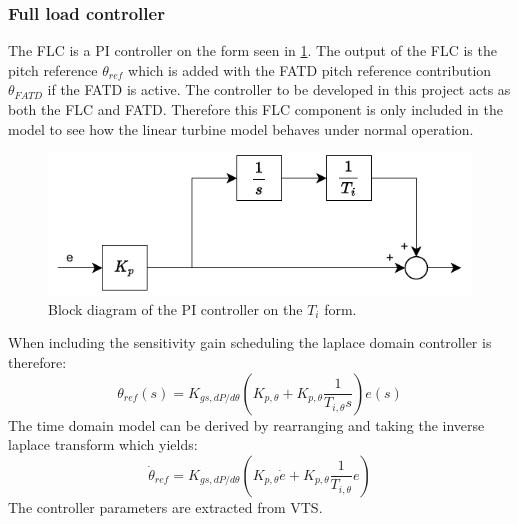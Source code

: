 \subsubsection{Full load controller} \label{sec:comp_flc}
The FLC is a PI controller on the form seen in \cref{fig:PIcontroller}. The output of the FLC is the pitch reference $ \theta_{ref} $ which is added with the FATD pitch reference contribution $ \theta_{FATD} $ if the FATD is active. The controller to be developed in this project acts as both the FLC and FATD. Therefore this FLC component is only included in the model to see how the linear turbine model behaves under normal operation.
\begin{figure}[ht]
	\centering
	\includegraphics[width=0.5\linewidth]{Graphics/PiController.pdf}
	\caption{Block diagram of the PI controller on the \textit{$T_i$} form.}
	\label{fig:PIcontroller}
\end{figure}
When including the sensitivity gain scheduling the laplace domain controller is therefore:
\begin{equation}\label{eq:comp_flc}
	\theta_{ref}(s) = K_{gs,dP/d\theta} (K_{p, \theta} + K_{p, \theta} \dfrac{1}{T_{i, \theta} s}) e(s)
\end{equation}
The time domain model can be derived by rearranging and taking the inverse laplace transform which yields:
\begin{equation}\label{eq:comp_flc_time}
	\dot{\theta}_{ref} = K_{gs,dP/d\theta} (K_{p, \theta} \dot{e} + K_{p, \theta} \dfrac{1}{T_{i, \theta}} e)
\end{equation}
The controller parameters are extracted from VTS.

